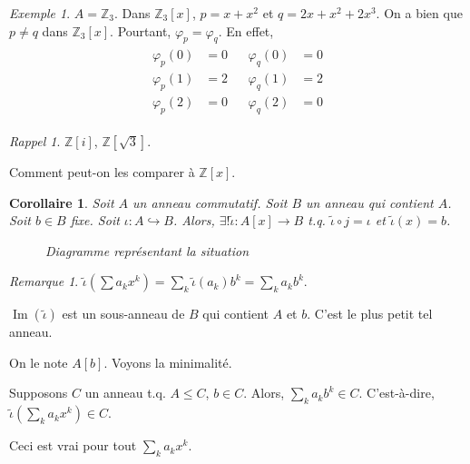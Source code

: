 \documentclass{report}
\newtheorem*{coro}{Corollaire}
\theoremstyle{definition}
\theoremstyle{remark}
\newtheorem*{exem}{Exemple}
\newtheorem*{rmq}{Remarque}
\newtheorem*{rapp}{Rappel}
\def\lte{\leqslant}
\def\ZZ{\mathbb{Z}}
\def\im{\operatorname{Im}}
\begin{document}
	\begin{exem}
		$A=\ZZ_3$. Dans $\ZZ_3[x]$, $p=x+x^2$ et $q=2x+x^2+2x^3$. On a bien que $p\neq q$ dans $\ZZ_3[x]$. Pourtant, $\varphi_p=\varphi_q$. En effet,
		\begin{align*}
			\begin{split}
				\varphi_p(0)&= 0\\
				\varphi_p(1)&= 2\\
				\varphi_p(2)&= 0
			\end{split}
			&
			\begin{split}
				\varphi_q(0)&= 0\\
				\varphi_q(1)&= 2\\
				\varphi_q(2)&= 0
			\end{split}
		\end{align*}
	\end{exem}

	\begin{rapp}
		$\ZZ[i]$, $\ZZ[\sqrt{3}]$.

		Comment peut-on les comparer \`a $\ZZ[x]$.
	\end{rapp}

	\begin{coro}
		Soit $A$ un anneau commutatif. Soit $B$ un anneau qui contient $A$. Soit $b\in B$ fixe. Soit $\iota:A \hookrightarrow B$. Alors, $\exists!\widetilde{\iota}:A[x]\to B$ t.q. $\widetilde{\iota}\circ j=\iota$ et $\widetilde{\iota}(x)=b$.
		\begin{figure}[h]
			\centering
			\caption{Diagramme repr\'esentant la situation}
		\end{figure}
	\end{coro}

	\begin{rmq}
		$\widetilde{\iota}\left(\sum a_kx^k\right) = \sum_k\widetilde{\iota}(a_k)b^k = \sum_k a_kb^k$.

		$\im(\widetilde{\iota})$ est un sous-anneau de $B$ qui contient $A$ et $b$. C'est le plus petit tel anneau.

		On le note $A[b]$. Voyons la minimalit\'e.

		Supposons $C$ un anneau t.q. $A\lte C$, $b\in C$. Alors, $\sum_ka_kb^k\in C$. C'est-\`a-dire, $\widetilde{\iota}\left(\sum_ka_kx^k\right)\in C$.

		Ceci est vrai pour tout $\sum_ka_kx^k$.
	\end{rmq}
\end{document}
